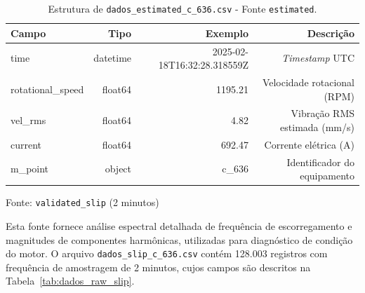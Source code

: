 \begin{table}[H]
  \centering
  \small
  \begin{tabular}{|l|r|r|r|}
    \hline
    \textbf{Campo}    & \textbf{Tipo} & \textbf{Exemplo}            & \textbf{Descrição}           \\
    \hline
    time              & datetime      & 2025-02-18T16:32:28.318559Z & \textit{Timestamp} UTC       \\
    rotational\_speed & float64       & 1195.21                     & Velocidade rotacional (RPM)  \\
    vel\_rms          & float64       & 4.82                        & Vibração RMS estimada (mm/s) \\
    current           & float64       & 692.47                      & Corrente elétrica (A)        \\
    m\_point          & object        & c\_636                      & Identificador do equipamento \\
    \hline
  \end{tabular}
  \caption{Estrutura de \texttt{dados\_estimated\_c\_636.csv} - Fonte \texttt{estimated}.}
  \label{tab:dados_raw_estimated}
\end{table}

Fonte: \texttt{validated\_slip} (2 minutos)

Esta fonte fornece análise espectral detalhada de frequência de escorregamento e magnitudes de componentes harmônicas, utilizadas para diagnóstico de condição do motor. O arquivo \texttt{dados\_slip\_c\_636.csv} contém 128.003 registros com frequência de amostragem de 2 minutos, cujos campos são descritos na Tabela~\ref{tab:dados_raw_slip}.

